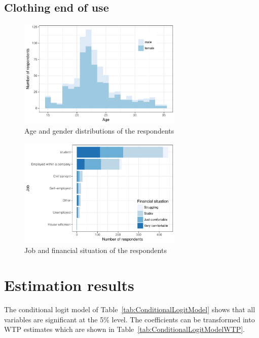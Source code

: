 \documentclass[review]{elsarticle}
\begin{document}
\subsection{Clothing end of use}



\begin{figure}[ht]
\begin{center}
 \includegraphics[width=0.7\textwidth]{figures/DemAgeGender.pdf}
 \caption{Age and gender distributions of the respondents}\label{fig:DemAgeGender}
 \end{center}
\end{figure}
\begin{figure}[ht]
\begin{center}
 \includegraphics[width=0.7\textwidth]{figures/DemJobIncome.pdf}
 \caption{Job and financial situation of the respondents}\label{fig:JobIncome}
 \end{center}
\end{figure}

\section{Estimation results}\label{sec:results}
The conditional logit model of Table~\ref{tab:ConditionalLogitModel} shows that all variables are significant at the 5\% level. The coefficients can be transformed into WTP estimates which are shown in Table~\ref{tab:ConditionalLogitModelWTP}.
\end{document}
